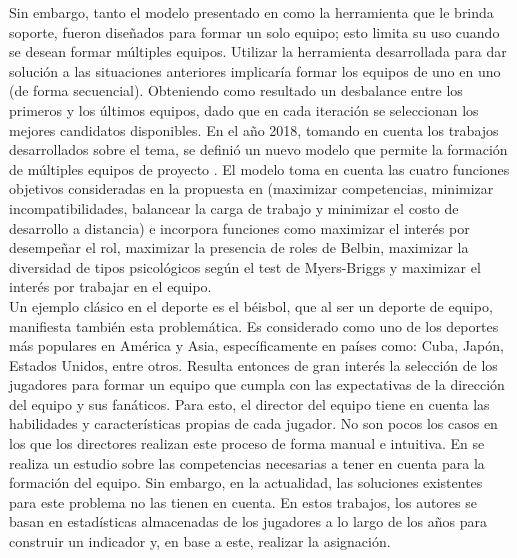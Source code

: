 Sin embargo, tanto el modelo presentado en \cite{Mayi09} como la herramienta que le brinda soporte, fueron diseñados para formar un solo equipo; esto limita su uso cuando se desean formar múltiples equipos. Utilizar la herramienta desarrollada para dar solución a las situaciones anteriores implicaría formar los equipos de uno en uno (de forma secuencial). Obteniendo como resultado un desbalance entre los primeros y los últimos equipos, dado que en cada iteración se seleccionan los mejores candidatos disponibles. En el año 2018, tomando en cuenta los trabajos desarrollados sobre el tema, se definió un nuevo modelo que permite la formación de múltiples equipos de proyecto \cite{Duran2019}. El modelo toma en cuenta las cuatro funciones objetivos consideradas en la propuesta en \cite{Mayi09} (maximizar competencias, minimizar incompatibilidades, balancear la carga de trabajo y minimizar el costo de desarrollo a distancia) e incorpora funciones como maximizar el interés por desempeñar el rol, maximizar la presencia de roles de Belbin, maximizar la diversidad de tipos psicológicos según el test de Myers-Briggs y maximizar el interés por trabajar en el equipo.\\

Un ejemplo clásico en el deporte es el béisbol, que al ser un deporte de equipo, manifiesta también esta problemática. Es considerado como uno de los deportes más populares en América y Asia, específicamente en países como: Cuba, Japón, Estados Unidos, entre otros. Resulta entonces de gran interés la selección de los jugadores para formar un equipo que cumpla con las expectativas de la dirección del equipo y sus fanáticos. Para esto, el director del equipo tiene en cuenta las habilidades y características propias de cada jugador. No son pocos los casos en los que los directores realizan este proceso de forma manual e intuitiva. En \cite{Smith1995} se realiza un estudio sobre las competencias necesarias a tener en cuenta para la formación del equipo. Sin embargo, en la actualidad, las soluciones existentes para este problema \cite{Polyashuk2015, Sugrue2007} no las tienen en cuenta. En estos trabajos, los autores se basan en estadísticas almacenadas de los jugadores a lo largo de los años para construir un indicador y, en base a este, realizar la asignación. \\

